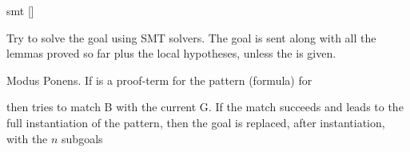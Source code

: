 \addAuto
{smt}
{[]}
{Try to solve the goal using SMT solvers. The goal is sent along with all the
 lemmas proved so far plus the local hypotheses, unless the  is
 given.
 
 \noindent
 }

{}
{Modus Ponens. If  is a proof-term for the pattern (formula) for
  \begin{center}
  \end{center}
  \noindent then \tacname{} tries to match B with the current G. If the
  match succeeds and leads to the full instantiation of the pattern,
  then the goal is replaced, after instantiation, with the $n$ subgoals
  }

